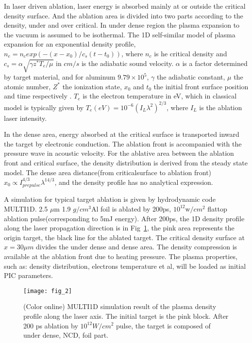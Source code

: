 \documentclass[aip,twocolumn,superscriptaddress,showpacs,amsmath]{revtex4}
\begin{document}
In laser driven ablation, laser energy is absorbed mainly at or outside the
critical density surface. And the ablation area is divided into two parts
according to the density, under and over critical. In under dense region the
plasma expansion to the vacuum is assumed to be isothermal. The 1D
self-similar model of plasma expansion for an exponential density
profile\cite{Max}, $n_e=n_c exp(-(x-x_0)/{c_s(t-t_0)})$, where $n_c$ is he
critical density and $c_s=\alpha \sqrt{\gamma z^*T_e/\mu}$ in $cm/s$ is the
adiabatic sound velocity. $\alpha$ is a factor determined by target material,
and for aluminum $9.79 \times 10^5$, $\gamma$ the adiabatic constant, $\mu$
the atomic number, $Z^*$ the ionization state, $x_0$ and $t_0$ the initial
front surface position and time respectively . $T_e$ is the electron
temperature in eV, which in classical model is typically given by
$T_e(eV)=10^{-6} (I_L{\lambda}^2)^{2/3}$, where $I_L$ is the ablation laser
intensity.


In the dense area, energy absorbed at the critical surface is transported
inward the target by electronic conduction. The ablation front is accompanied
with the pressure wave in acoustic velocity. For the ablative area between the
ablation front and critical surface, the density distribution is derived from
the steady state model. The dense area distance(from criticalsurface to ablation
front) $x_0 \propto  I_{prepulse}^{4/3} {\lambda}^{14/3}$\cite{man,mora2},
and the density profile has no analytical expression.



A simulation for typical target ablation is given by hydrodynamic code
MULTI1D\cite{multi}. 2.5 $\mu$m 1.9 $g/cm^3$Al foil is ablated by 200ps,
$10^{12} \text{w}/cm^2$ flattop ablation pulse(corresponding to 5mJ energy).
After 200ps, the 1D density profile along the laser propagation direction is
in Fig~\ref{fig2}, the pink area represents the origin target, the black line
for the ablated target. The critical density surface at $x=30 \mu m$ divides
the under dense and dense area. The density compression is available at the
ablation front due to heating pressure. The plasma properties, such as:
density distribution, electrons temperature et al, will be loaded as initial
PIC parameters.


\begin{figure}[htbp]
\texttt{[image: fig\_2]}
\caption{\label{fig2}(Color online) MULTI1D simulation result of the plasma
density profile along the laser axis. The initial target is the pink block.
After 200 ps ablation by $10^{12} W/{cm}^2$ pulse, the target is composed of
under dense, NCD, foil part. }
\end{figure}
\end{document}
